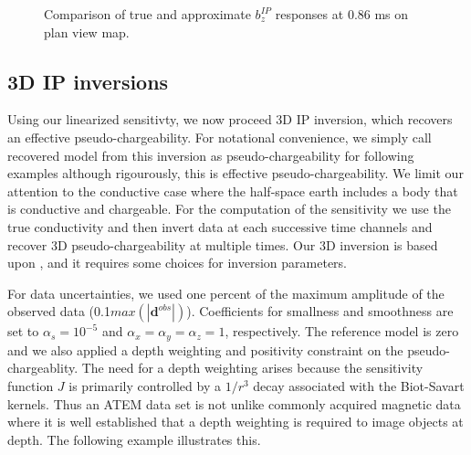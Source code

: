 \documentclass[extra,mreferee]{gji}
\begin{document}
\begin{figure}
  \caption{Comparison of true and approximate $b_z^{IP}$ responses at 0.86 ms on plan view map. }
  \label{F:EquivPeta_True_Approx}
\end{figure}
\clearpage

\subsection{3D IP inversions}
Using our linearized sensitivty, we now proceed 3D IP inversion, which recovers an effective pseudo-chargeability. For notational convenience, we simply call recovered model from this inversion as pseudo-chargeability for following examples although rigourously, this is effective pseudo-chargeability. 
We limit our attention to the conductive case where the half-space earth includes a body that is conductive and chargeable.
For the computation of the sensitivity we use the true conductivity and then invert data at each  successive time channels and recover 3D pseudo-chargeability at multiple times. 
Our 3D inversion is based upon \cite[]{doug1994,Li2000}, and it requires some choices for inversion parameters. 

For data uncertainties, we used one percent of the maximum amplitude of the observed data (0.1$max(|\mathbf{d}^{obs}|)$). Coefficients for smallness and smoothness are set to $\alpha_s=10^{-5}$ and $\alpha_x=\alpha_y=\alpha_z=1$, respectively. The reference model is zero and we also applied a depth weighting and positivity constraint on the pseudo-chargeablity. 
The need for a depth weighting arises because the sensitivity function $J$ is primarily controlled by a $1/r^3$ decay associated with the Biot-Savart kernels.  Thus an ATEM data set is not unlike commonly acquired  magnetic data where it is well established that a depth weighting is required to image objects at depth. The following example illustrates this. 
\end{document}
